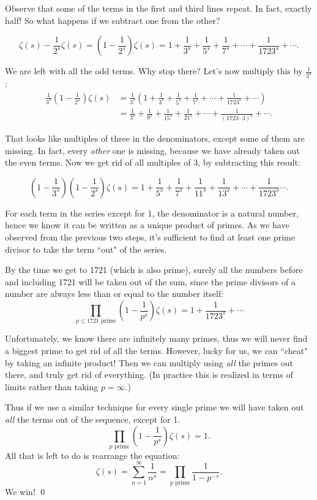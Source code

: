 \documentclass[12pt,reqno]{amsart}
\theoremstyle{plain} %
\theoremstyle{remark}
\theoremstyle{definition}
\begin{document}
Observe that some of the terms in the first and third lines repeat. In fact, exactly half! So what happens if we subtract one from the other?

\[
\zeta(s) - \frac{1}{2^s}\zeta(s) = \left( 1-\frac{1}{2^s}\right) \zeta(s) = 1 + \frac{1}{3^s} + \frac{1}{5^s} + \frac{1}{7^s}+\cdots + \frac{1}{1723^s} + \cdots. 
\]

We are left with all the odd terms. Why stop there? Let's now multiply this by $\frac{1}{3^s}$:
\begin{align*}
\frac{1}{3^s}\left( 1- \frac{1}{2^s}\right)\zeta(s) &= \frac{1}{3^s}\left(1+\frac{1}{3^s} + \frac{1}{5^s} + \frac{1}{7^s}+\cdots +\frac{1}{1723^s}+\cdots\right) \\
&= \frac{1}{3^s} + \frac{1}{9^s} + \frac{1}{15^s} + \frac{1}{21^s} + \cdots + \frac{1}{(1723\cdot 3)^s} + \cdots .
\end{align*}

That looks like multiples of three in the denominators, except some of them are missing. In fact, every \textit{other} one is missing, because we have already taken out the even terms. Now we get rid of all multiples of 3, by subtracting this result:

\[
\left( 1- \frac{1}{3^s}\right) \left( 1- \frac{1}{2^s}\right)\zeta(s)  = 1+ \frac{1}{5^s} + \frac{1}{7^s}+\frac{1}{11^s} + \frac{1}{13^s} + \cdots  + \frac{1}{1723^s} \cdots .
\]

For each term in the series except for 1, the denominator is a natural number, hence we know it can be written as a unique product of primes. As we have observed from the previous two steps, it's sufficient to find at least one prime divisor to take the term ``out" of the series. 

By the time we get to 1721 (which is also prime), surely all the numbers before and including 1721 will be taken out of the sum, since the prime divisors of a number are always less than or equal to the number itself:
\[
\prod_{p \leq 1721 \text{ prime}} \left( 1-\frac{1}{p^s}\right)\zeta(s) = 1+\frac{1}{1723^s}+\cdots 
\]

Unfortunately, we know there are infinitely many primes, thus we will never find a biggest prime to get rid of all the terms. However, lucky for us, we can ``cheat" by taking an infinite product! Then we can multiply using \textit{all} the primes out there, and truly get rid of everything. (In practice this is realized in terms of limits rather than taking $p= \infty$.)

Thus if we use a similar technique for every single prime we will have taken out \textit{all} the terms out of the sequence, except for 1.
\[
\prod_{p \text{ prime}} \left( 1-\frac{1}{p^s}\right)\zeta(s) = 1 .
\]
All that is left to do is rearrange the equation:
\[
\zeta(s) = \sum_{n=1}^\infty \frac{1}{n^s} = \prod_{p \text{ prime}} \frac{1}{1-p^{-s}} .
\]
We win! \qed

\end{document}
